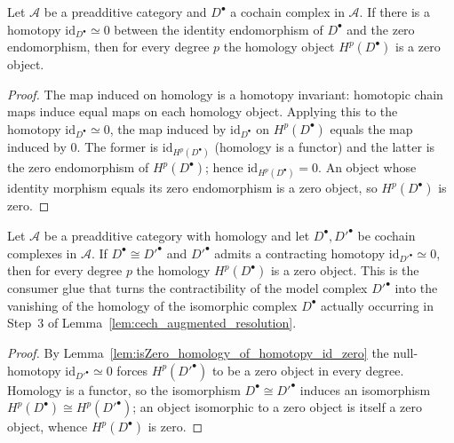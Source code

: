 \begin{lemma}\leanok
  \label{lem:isZero_homology_of_homotopy_id_zero}
  Let \(\mathcal{A}\) be a preadditive category and \(D^\bullet\) a cochain complex in
  \(\mathcal{A}\). If there is a homotopy \(\mathrm{id}_{D^\bullet} \simeq 0\) between the
  identity endomorphism of \(D^\bullet\) and the zero endomorphism, then for every degree
  \(p\) the homology object \(H^p(D^\bullet)\) is a zero object.
\end{lemma}
\begin{proof}

\leanok
  The map induced on homology is a homotopy invariant: homotopic chain maps induce equal
  maps on each homology object. Applying this to the homotopy \(\mathrm{id}_{D^\bullet}
  \simeq 0\), the map induced by \(\mathrm{id}_{D^\bullet}\) on \(H^p(D^\bullet)\) equals the
  map induced by \(0\). The former is \(\mathrm{id}_{H^p(D^\bullet)}\) (homology is a
  functor) and the latter is the zero endomorphism of \(H^p(D^\bullet)\); hence
  \(\mathrm{id}_{H^p(D^\bullet)} = 0\). An object whose identity morphism equals its zero
  endomorphism is a zero object, so \(H^p(D^\bullet)\) is zero.
\end{proof}

\begin{lemma}\leanok
  \label{lem:isZero_homology_of_iso_homotopy_id_zero}
  Let \(\mathcal{A}\) be a preadditive category with homology and let \(D^\bullet, D'^\bullet\) be
  cochain complexes in \(\mathcal{A}\). If \(D^\bullet \cong D'^\bullet\) and \(D'^\bullet\) admits
  a contracting homotopy \(\mathrm{id}_{D'^\bullet} \simeq 0\), then for every degree \(p\) the
  homology \(H^p(D^\bullet)\) is a zero object. This is the consumer glue that turns the
  contractibility of the model complex \(D'^\bullet\) into the vanishing of the homology of the
  isomorphic complex \(D^\bullet\) actually occurring in Step~3 of
  Lemma~\ref{lem:cech_augmented_resolution}.
\end{lemma}
\begin{proof}
  \leanok
  By Lemma~\ref{lem:isZero_homology_of_homotopy_id_zero} the null-homotopy \(\mathrm{id}_{D'^\bullet}
  \simeq 0\) forces \(H^p(D'^\bullet)\) to be a zero object in every degree. Homology is a functor,
  so the isomorphism \(D^\bullet \cong D'^\bullet\) induces an isomorphism \(H^p(D^\bullet) \cong
  H^p(D'^\bullet)\); an object isomorphic to a zero object is itself a zero object, whence
  \(H^p(D^\bullet)\) is zero.
\end{proof}

